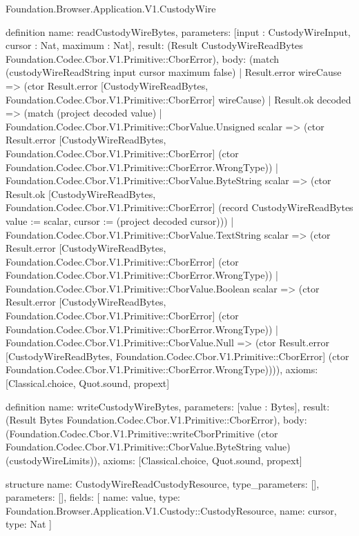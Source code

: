 \begin{lexlean}{Foundation.Browser.Application.V1.CustodyWire}
\begin{semanticmodule}
definition{
  name: readCustodyWireBytes,
  parameters: [input : CustodyWireInput, cursor : Nat, maximum : Nat],
  result: (Result CustodyWireReadBytes Foundation.Codec.Cbor.V1.Primitive::CborError),
  body: (match (custodyWireReadString input cursor maximum false)
    | Result.error wireCause => (ctor Result.error [CustodyWireReadBytes, Foundation.Codec.Cbor.V1.Primitive::CborError] wireCause)
    | Result.ok decoded => (match (project decoded value)
      | Foundation.Codec.Cbor.V1.Primitive::CborValue.Unsigned scalar => (ctor Result.error [CustodyWireReadBytes, Foundation.Codec.Cbor.V1.Primitive::CborError] (ctor Foundation.Codec.Cbor.V1.Primitive::CborError.WrongType))
      | Foundation.Codec.Cbor.V1.Primitive::CborValue.ByteString scalar => (ctor Result.ok [CustodyWireReadBytes, Foundation.Codec.Cbor.V1.Primitive::CborError] (record CustodyWireReadBytes {value := scalar, cursor := (project decoded cursor)}))
      | Foundation.Codec.Cbor.V1.Primitive::CborValue.TextString scalar => (ctor Result.error [CustodyWireReadBytes, Foundation.Codec.Cbor.V1.Primitive::CborError] (ctor Foundation.Codec.Cbor.V1.Primitive::CborError.WrongType))
      | Foundation.Codec.Cbor.V1.Primitive::CborValue.Boolean scalar => (ctor Result.error [CustodyWireReadBytes, Foundation.Codec.Cbor.V1.Primitive::CborError] (ctor Foundation.Codec.Cbor.V1.Primitive::CborError.WrongType))
      | Foundation.Codec.Cbor.V1.Primitive::CborValue.Null => (ctor Result.error [CustodyWireReadBytes, Foundation.Codec.Cbor.V1.Primitive::CborError] (ctor Foundation.Codec.Cbor.V1.Primitive::CborError.WrongType)))),
  axioms: [Classical.choice, Quot.sound, propext]
}

definition{
  name: writeCustodyWireBytes,
  parameters: [value : Bytes],
  result: (Result Bytes Foundation.Codec.Cbor.V1.Primitive::CborError),
  body: (Foundation.Codec.Cbor.V1.Primitive::writeCborPrimitive (ctor Foundation.Codec.Cbor.V1.Primitive::CborValue.ByteString value) (custodyWireLimits)),
  axioms: [Classical.choice, Quot.sound, propext]
}

structure{
  name: CustodyWireReadCustodyResource,
  type_parameters: [],
  parameters: [],
  fields: [
    {name: value, type: Foundation.Browser.Application.V1.Custody::CustodyResource},
    {name: cursor, type: Nat}
  ]
}


\end{semanticmodule}
\end{lexlean}
